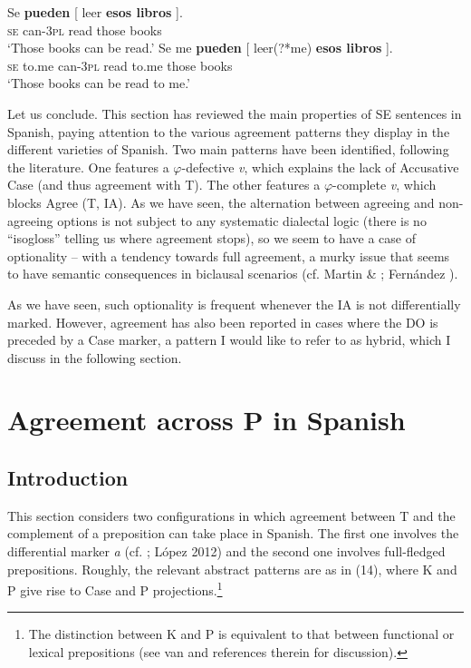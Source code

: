\documentclass[output=paper]{langsci/langscibook}
\begin{document}
\ea%
    \label{ex:gallego:13}
    \ea
    \gll Se  \textbf{pueden}  [ leer   \textbf{esos    libros} ].\\
         \textsc{se} can\textsc{{}-3pl}   read  those  books\\
    \glt ‘Those books can be read.’
    \ex
    \gll Se   me      \textbf{pueden}  [ leer(?*me)    \textbf{esos    libros} ].\\
         \textsc{se} to.me  can\textsc{{}-3pl}    read   to.me  those  books\\
    \glt ‘Those books can be read to me.’
    \z
\z

Let us conclude. This section has reviewed the main properties of SE sentences in Spanish, paying attention to the various agreement patterns they display in the different varieties of Spanish. Two main patterns have been identified, following the literature. One features a $\varphi $-defective \textit{v}, which explains the lack of Accusative Case (and thus agreement with T). The other features a $\varphi $-complete \textit{v}, which blocks Agree (T, IA). As we have seen, the alternation between agreeing and non-agreeing options is not subject to any systematic dialectal logic (there is no “isogloss” telling us where agreement stops), so we seem to have a case of optionality – with a tendency towards full agreement, a murky issue that seems to have semantic consequences in biclausal scenarios (cf. Martin \& \citealt{Uriagereka1998}; Fernández \citealt{Serrano2016}). 

As we have seen, such optionality is frequent whenever the IA is not differentially marked. However, agreement has also been reported in cases where the DO is preceded by a Case marker, a pattern I would like to refer to as hybrid, which I discuss in the following section.

\section{Agreement across P in Spanish} %
\subsection{Introduction}%

This section considers two configurations in which agreement between T and the complement of a preposition can take place in Spanish. The first one involves the differential marker \textit{a} (cf. \citealt{Torrego1998}; López 2012) and the second one involves full-fledged prepositions. Roughly, the relevant abstract patterns are as in (14), where K and P give rise to Case and P projections.\footnote{The distinction between K and P is equivalent to that between functional or lexical prepositions (see van \citealt{Riemsdijk1990} and references therein for discussion).}
\end{document}
